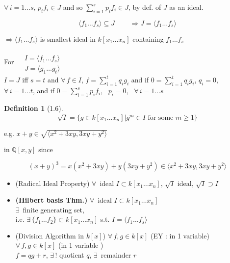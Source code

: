 \documentclass[10pt]{amsart}
\newtheorem{definition}{Definition}
\newcommand{\exercisehead}[1]
  { \smallskip
   \noindent{\small\bf Exercise #1.}
  }
\begin{document}
\begin{multicols*}{2}
$\forall \, i = 1 \dots s$, $p_i f_i \in J$ and so $\sum_{i=1}^s p_i f_i \in J$, by def. of $J$ as an ideal.

\[
\langle f_1 \dots f_s \rangle \subseteq J \quad \quad \, \Longrightarrow J = \langle f_1 \dots f_s \rangle
\]

$\Longrightarrow \langle f_1 \dots f_s \rangle$ is smallest ideal in $k[x_1 \dots x_n]$ containing $f_1 \dots f_s$


\exercisehead{4} For $\begin{aligned} & \quad \\
  & I = \langle f_1 \dots f_s \rangle \\
  & J = \langle g_1 \dots g_t \rangle \end{aligned}$ \\

 $I = J$ iff $s=t$ and $\forall \, f \in I$, $f = \sum_{i=1}^t q_i g_i$ and if $ 0  = \sum_{i=1}^t q_i g_i$, $q_i =0$, \, $\forall \, i = 1 \dots t$, and if $0 = \sum_{i=1}^s p_i f_i$, \, $p_i = 0$, \, $\forall \,  i = 1 \dots s$


\begin{definition}[1.6]
\[
\sqrt{I} = \lbrace g \in k[x_1\dots x_n] | g^m \in I \text{ for some } m \geq 1 \rbrace
\]
\end{definition}

e.g. $x+y \in \sqrt{ \langle x^2 + 3 xy , 3xy + y^2 \rangle }$

in $\mathbb{Q}[x,y]$ since 

\[
(x+y)^3 =x(x^2 + 3xy) + y(3xy + y^2) \in \langle x^2 + 3xy, 3xy + y^2\rangle
\]






\begin{itemize}
\item (Radical Ideal Property) $\forall \, $ ideal $I\subset k[x_1 \dots x_n]$, $\sqrt{I}$ ideal, $\sqrt{I} \supset I$
\item \textbf{(Hilbert basis Thm.)} $\forall \, $ ideal $I\subset k[x_1\dots x_n]$ \\
$\exists \, $ finite generating set, \\
i.e. $\exists \, \lbrace f_1 \dots f_2 \rbrace \subset k [x_1 \dots x_n]$ s.t. $I=\langle f_1 \dots f_s \rangle$
\item (Division Algorithm in $k[x]$) $\forall \, f,g \in  k[x]$ (EY : in 1 variable) \\
$\forall \, f, g \in k[x]$ (in 1 variable )\\
$f= qg + r$, $\exists \, !$ quotient $q$, $\exists \, $ remainder $r$
\end{itemize}


\end{multicols*}
\end{document}
